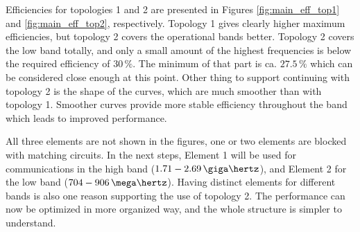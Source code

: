 Efficiencies for topologies 1 and 2 are presented in Figures \ref{fig:main_eff_top1} and \ref{fig:main_eff_top2}, respectively. Topology 1 gives clearly higher maximum efficiencies, but topology 2 covers the operational bands better. Topology 2 covers the low band totally, and only a small amount of the highest frequencies is below the required efficiency of $30\,\%$. The minimum of that part is ca. $27.5\,\%$ which can be considered close enough at this point. Other thing to support continuing with topology 2 is the shape of the curves, which are much smoother than with topology 1. Smoother curves provide more stable efficiency throughout the band which leads to improved performance.

All three elements are not shown in the figures, one or two elements are blocked with matching circuits. In the next steps, Element 1 will be used for communications in the high band ($1.71-2.69\,\giga\hertz$), and Element 2 for the low band ($704-906\,\mega\hertz$). Having distinct elements for different bands is also one reason supporting the use of topology 2. The performance can now be optimized in more organized way, and the whole structure is simpler to understand.


